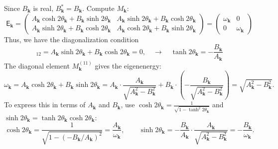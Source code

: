 \documentclass[aps, prx, nofootinbib, superscriptaddress]{revtex4-2}
\newcommand{\kvec}{\mathbf{k}}
\begin{document}
Since $ B_{\mathbf{k}} $ is real, $ B_{\mathbf{k}}^{*} = B_{\mathbf{k}} $.
Compute $ M_{\mathbf{k}} $:
\begin{equation}
    \mathsf{E}_{\mathbf{k}}
    = 
    \begin{pmatrix}
        A_{\mathbf{k}} \cosh 2\theta_{\mathbf{k}} + B_{\mathbf{k}} \sinh 2\theta_{\mathbf{k}} 
        & A_{\mathbf{k}} \sinh 2\theta_{\mathbf{k}} + B_{\mathbf{k}} \cosh 2\theta_{\mathbf{k}}\\
        A_{\mathbf{k}} \sinh 2\theta_{\mathbf{k}} + B_{\mathbf{k}} \cosh 2\theta_{\mathbf{k}} 
        & A_{\mathbf{k}} \cosh 2\theta_{\mathbf{k}} + B_{\mathbf{k}} \sinh 2\theta_{\mathbf{k}} 
    \end{pmatrix}
    = 
    \begin{pmatrix}
        \omega_{\kvec}
        & 0 \\ 0 & 
        \omega_{\kvec}
    \end{pmatrix}
\end{equation}
Thus, we have the diagonalization condition
\begin{equation}
    [\mathsf{E}_{\mathbf{k}}]_{12} = A_{\mathbf{k}} \sinh 2\theta_{\mathbf{k}} + B_{\mathbf{k}} \cosh 2\theta_{\mathbf{k}} = 0,
    \quad \rightarrow \quad
    \tanh 2\theta_{\mathbf{k}} = -\frac{B_{\mathbf{k}}}{A_{\mathbf{k}}}
\end{equation}
The diagonal element $M_{\kvec}^{(11)}$ gives the eigenenergy:
\begin{equation}
    \omega_{\mathbf{k}} 
    = A_{\mathbf{k}} \cosh 2\theta_{\mathbf{k}} + B_{\mathbf{k}} \sinh 2\theta_{\mathbf{k}} 
    = A_{\mathbf{k}} \cdot \frac{A_{\mathbf{k}}}{\sqrt{A_{\mathbf{k}}^2 - B_{\mathbf{k}}^2}} + B_{\mathbf{k}} \cdot \left(-\frac{B_{\mathbf{k}}}{\sqrt{A_{\mathbf{k}}^2 - B_{\mathbf{k}}^2}}\right) 
    = \sqrt{A_{\mathbf{k}}^2 - B_{\mathbf{k}}^2}.
\end{equation}
To express this in terms of $ A_{\mathbf{k}} $ and $ B_{\mathbf{k}} $, use $ \cosh 2\theta_{\mathbf{k}} = \frac{1}{\sqrt{1 - \tanh^2 2\theta_{\mathbf{k}}}} $ and $ \sinh 2\theta_{\mathbf{k}} = \tanh 2\theta_{\mathbf{k}} \cosh 2\theta_{\mathbf{k}} $:
\begin{equation*}
    \cosh 2\theta_{\mathbf{k}} = \frac{1}{\sqrt{1 - \left(-B_{\mathbf{k}} / A_{\mathbf{k}} \right)^2}} = \frac{A_{\mathbf{k}}}{\omega_{\kvec}},  
    \qquad 
    \sinh 2\theta_{\mathbf{k}} = -\frac{B_{\mathbf{k}}}{A_{\mathbf{k}}} \cdot \frac{A_{\mathbf{k}}}{\sqrt{A_{\mathbf{k}}^2 - B_{\mathbf{k}}^2}} = -\frac{B_{\mathbf{k}}}{\omega_{\kvec}}.
\end{equation*}
\end{document}
